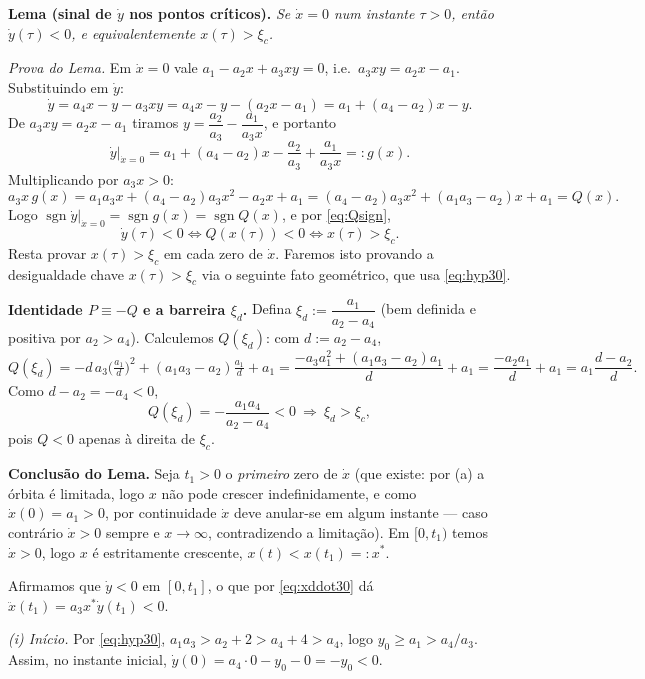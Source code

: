 \begin{enumerate}[label=(\alph*)]
\textbf{Lema (sinal de $\dot y$ nos pontos críticos).} \emph{Se $\dot x=0$ num instante $\tau>0$, então $\dot y(\tau)<0$, e equivalentemente $x(\tau)>\xi_c$.}

\emph{Prova do Lema.} Em $\dot x=0$ vale $a_1-a_2x+a_3xy=0$, i.e.\ $a_3xy=a_2x-a_1$. Substituindo em $\dot y$:
\[
\dot y=a_4x-y-a_3xy=a_4x-y-(a_2x-a_1)=a_1+(a_4-a_2)x-y .
\]
De $a_3xy=a_2x-a_1$ tiramos $y=\dfrac{a_2}{a_3}-\dfrac{a_1}{a_3x}$, e portanto
\[
\dot y\big|_{\dot x=0}=a_1+(a_4-a_2)x-\frac{a_2}{a_3}+\frac{a_1}{a_3x}=:g(x).
\]
Multiplicando por $a_3x>0$:
\[
a_3x\,g(x)=a_1a_3x+(a_4-a_2)a_3x^2-a_2x+a_1=(a_4-a_2)a_3x^2+(a_1a_3-a_2)x+a_1=Q(x).
\]
Logo $\operatorname{sgn}\dot y\big|_{\dot x=0}=\operatorname{sgn}g(x)=\operatorname{sgn}Q(x)$, e por \eqref{eq:Qsign},
\begin{equation}\label{eq:equiv30}
\dot y(\tau)<0\iff Q(x(\tau))<0\iff x(\tau)>\xi_c .
\end{equation}
Resta provar $x(\tau)>\xi_c$ em cada zero de $\dot x$. Faremos isto provando a desigualdade chave $x(\tau)>\xi_c$ via o seguinte fato geométrico, que usa \eqref{eq:hyp30}.

\textbf{Identidade $P\equiv-Q$ e a barreira $\xi_d$.}
Defina $\xi_d:=\dfrac{a_1}{a_2-a_4}$ (bem definida e positiva por $a_2>a_4$). Calculemos $Q(\xi_d)$: com $d:=a_2-a_4$,
\[
Q(\xi_d)=-d\,a_3\Big(\tfrac{a_1}{d}\Big)^2+(a_1a_3-a_2)\tfrac{a_1}{d}+a_1
=\frac{-a_3a_1^2+(a_1a_3-a_2)a_1}{d}+a_1
=\frac{-a_2a_1}{d}+a_1=a_1\frac{d-a_2}{d}.
\]
Como $d-a_2=-a_4<0$,
\begin{equation}\label{eq:Qxd}
Q(\xi_d)=-\frac{a_1a_4}{a_2-a_4}<0\ \Longrightarrow\ \xi_d>\xi_c ,
\end{equation}
pois $Q<0$ apenas à direita de $\xi_c$.

\textbf{Conclusão do Lema.} Seja $t_1>0$ o \emph{primeiro} zero de $\dot x$ (que existe: por (a) a órbita é limitada, logo $x$ não pode crescer indefinidamente, e como $\dot x(0)=a_1>0$, por continuidade $\dot x$ deve anular-se em algum instante --- caso contrário $\dot x>0$ sempre e $x\to\infty$, contradizendo a limitação). Em $[0,t_1)$ temos $\dot x>0$, logo $x$ é estritamente crescente, $x(t)<x(t_1)=:x^*$.

Afirmamos que $\dot y<0$ em $[0,t_1]$, o que por \eqref{eq:xddot30} dá $\ddot x(t_1)=a_3x^*\dot y(t_1)<0$.

\emph{(i) Início.} Por \eqref{eq:hyp30}, $a_1a_3>a_2+2>a_4+4>a_4$, logo $y_0\ge a_1>a_4/a_3$. Assim, no instante inicial, $\dot y(0)=a_4\cdot0-y_0-0=-y_0<0$.


\end{enumerate}
